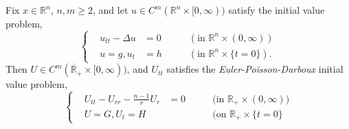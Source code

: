\documentclass{article}
\numberwithin{equation}{section}
\begin{document}
	\begin{lemma}
		Fix $x \in\mathbb{R}^{n}$, $n, m \geq 2$, and let $u \in C^{m}(\mathbb{R}^{n} \times [0, \infty))$ satisfy the initial value problem, 
		\begin{equation*}
			\left\{
			\begin{alignedat}{3}
				&u_{tt} - \Delta u &= 0 &\qquad (\text{in $\mathbb{R}^{n} \times (0,\infty)$}) \\
				&u = g, u_{t} &= h &\qquad (\text{in $\mathbb{R}^{n} \times \{t = 0\}$}). 
			\end{alignedat}
			\right. 
		\end{equation*}
		Then $U \in C^{m}(\overline{\mathbb{R}}_{+} \times [0,\infty))$, and $U_{tt}$ satisfies the \textit{Euler-Poisson-Darboux} initial value problem, 
		\begin{equation}
			\left\{
			\begin{alignedat}{3}
				&U_{tt} - U_{rr} - \frac{n-1}{r}U_{r} &= 0 & \qquad (\text{in $\mathbb{R}_{+} \times (0,\infty)$)} \\
				&U = G, U_{t} = H& &\qquad (\text{on $\mathbb{R}_{+} \times \{t = 0\}$}
			\end{alignedat}
			\right. 
		\end{equation}
	\end{lemma}
\end{document}

